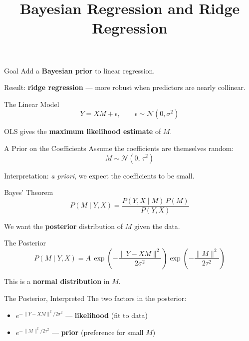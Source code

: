 \documentclass{beamer}
\title{Bayesian Regression and Ridge Regression}
\author{}
\date{}
\begin{document}
\maketitle

\begin{frame}{Goal}
Add a \textbf{Bayesian prior} to linear regression.

\bigskip
Result: \textbf{ridge regression} — more robust when predictors are nearly collinear.
\end{frame}

\begin{frame}{The Linear Model}
\[
  Y = XM + \epsilon, \qquad \epsilon \sim \mathcal{N}(0,\sigma^2)
\]

\bigskip
OLS gives the \textbf{maximum likelihood estimate} of $M$.
\end{frame}

\begin{frame}{A Prior on the Coefficients}
Assume the coefficients are themselves random:
\[
  M \sim \mathcal{N}(0,\, \tau^2)
\]

\bigskip
Interpretation: \emph{a priori}, we expect the coefficients to be small.
\end{frame}

\begin{frame}{Bayes' Theorem}
\[
  P(M \mid Y, X) = \frac{P(Y,X \mid M)\, P(M)}{P(Y,X)}
\]

\bigskip
We want the \textbf{posterior} distribution of $M$ given the data.
\end{frame}

\begin{frame}{The Posterior}
\[
  P(M \mid Y, X) = A\, \exp\!\left(-\frac{\|Y - XM\|^2}{2\sigma^2}\right) \exp\!\left(-\frac{\|M\|^2}{2\tau^2}\right)
\]

\bigskip
This is a \textbf{normal distribution} in $M$.
\end{frame}

\begin{frame}{The Posterior, Interpreted}
The two factors in the posterior:

\bigskip
\begin{itemize}
  \item $\displaystyle e^{-\|Y-XM\|^2/2\sigma^2}$ \quad — \textbf{likelihood} (fit to data)

  \bigskip
  \item $\displaystyle e^{-\|M\|^2/2\tau^2}$ \quad\quad\;\; — \textbf{prior} (preference for small $M$)
\end{itemize}
\end{frame}
\end{document}
